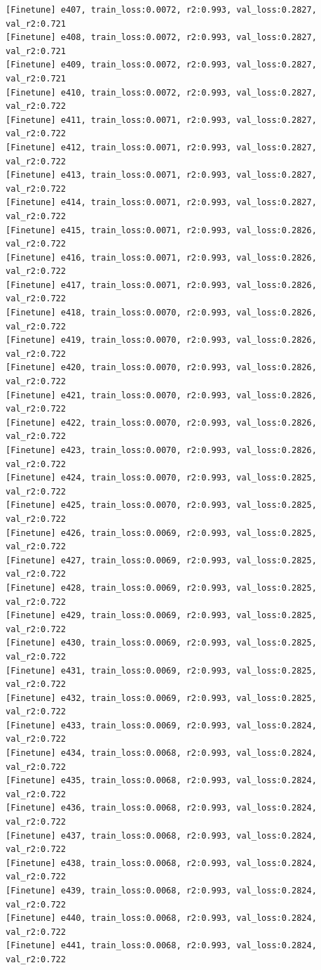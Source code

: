 \documentclass[a4paper, 12pt]{article}
\begin{document}
\begin{lstlisting}
[Finetune] e407, train_loss:0.0072, r2:0.993, val_loss:0.2827, val_r2:0.721
[Finetune] e408, train_loss:0.0072, r2:0.993, val_loss:0.2827, val_r2:0.721
[Finetune] e409, train_loss:0.0072, r2:0.993, val_loss:0.2827, val_r2:0.721
[Finetune] e410, train_loss:0.0072, r2:0.993, val_loss:0.2827, val_r2:0.722
[Finetune] e411, train_loss:0.0071, r2:0.993, val_loss:0.2827, val_r2:0.722
[Finetune] e412, train_loss:0.0071, r2:0.993, val_loss:0.2827, val_r2:0.722
[Finetune] e413, train_loss:0.0071, r2:0.993, val_loss:0.2827, val_r2:0.722
[Finetune] e414, train_loss:0.0071, r2:0.993, val_loss:0.2827, val_r2:0.722
[Finetune] e415, train_loss:0.0071, r2:0.993, val_loss:0.2826, val_r2:0.722
[Finetune] e416, train_loss:0.0071, r2:0.993, val_loss:0.2826, val_r2:0.722
[Finetune] e417, train_loss:0.0071, r2:0.993, val_loss:0.2826, val_r2:0.722
[Finetune] e418, train_loss:0.0070, r2:0.993, val_loss:0.2826, val_r2:0.722
[Finetune] e419, train_loss:0.0070, r2:0.993, val_loss:0.2826, val_r2:0.722
[Finetune] e420, train_loss:0.0070, r2:0.993, val_loss:0.2826, val_r2:0.722
[Finetune] e421, train_loss:0.0070, r2:0.993, val_loss:0.2826, val_r2:0.722
[Finetune] e422, train_loss:0.0070, r2:0.993, val_loss:0.2826, val_r2:0.722
[Finetune] e423, train_loss:0.0070, r2:0.993, val_loss:0.2826, val_r2:0.722
[Finetune] e424, train_loss:0.0070, r2:0.993, val_loss:0.2825, val_r2:0.722
[Finetune] e425, train_loss:0.0070, r2:0.993, val_loss:0.2825, val_r2:0.722
[Finetune] e426, train_loss:0.0069, r2:0.993, val_loss:0.2825, val_r2:0.722
[Finetune] e427, train_loss:0.0069, r2:0.993, val_loss:0.2825, val_r2:0.722
[Finetune] e428, train_loss:0.0069, r2:0.993, val_loss:0.2825, val_r2:0.722
[Finetune] e429, train_loss:0.0069, r2:0.993, val_loss:0.2825, val_r2:0.722
[Finetune] e430, train_loss:0.0069, r2:0.993, val_loss:0.2825, val_r2:0.722
[Finetune] e431, train_loss:0.0069, r2:0.993, val_loss:0.2825, val_r2:0.722
[Finetune] e432, train_loss:0.0069, r2:0.993, val_loss:0.2825, val_r2:0.722
[Finetune] e433, train_loss:0.0069, r2:0.993, val_loss:0.2824, val_r2:0.722
[Finetune] e434, train_loss:0.0068, r2:0.993, val_loss:0.2824, val_r2:0.722
[Finetune] e435, train_loss:0.0068, r2:0.993, val_loss:0.2824, val_r2:0.722
[Finetune] e436, train_loss:0.0068, r2:0.993, val_loss:0.2824, val_r2:0.722
[Finetune] e437, train_loss:0.0068, r2:0.993, val_loss:0.2824, val_r2:0.722
[Finetune] e438, train_loss:0.0068, r2:0.993, val_loss:0.2824, val_r2:0.722
[Finetune] e439, train_loss:0.0068, r2:0.993, val_loss:0.2824, val_r2:0.722
[Finetune] e440, train_loss:0.0068, r2:0.993, val_loss:0.2824, val_r2:0.722
[Finetune] e441, train_loss:0.0068, r2:0.993, val_loss:0.2824, val_r2:0.722

\end{lstlisting}
\end{document}
